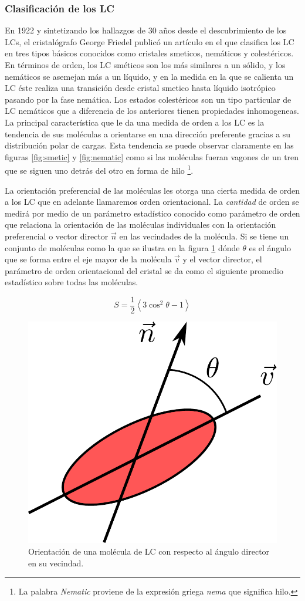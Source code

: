 \subsubsection{Clasificación de los LC}  
\label{sec:LC-clasification}
En 1922 y sintetizando los hallazgos de 30 años desde el descubrimiento
de los LCs, el cristalógrafo George Friedel publicó un artículo 
en el que clasifica los LC en tres tipos básicos conocidos como
cristales smeticos, nemáticos y colestéricos.
En términos de orden, los LC sméticos son los más similares a un
sólido, y los nemáticos se asemejan más a un líquido, y en la medida
en la que se calienta un LC éste realiza una transición desde cristal
smetico hasta líquido isotrópico pasando por la fase nemática. Los estados
colestéricos son un tipo particular de LC nemáticos que a diferencia
de los anteriores tienen propiedades inhomogeneas. 
La principal característica que le da una medida de orden a los LC es
la tendencia de sus moléculas a orientarse en una dirección
preferente gracias a su distribución polar de cargas. Esta tendencia
se puede observar claramente en las figuras \ref{fig:smetic} y
\ref{fig:nematic} como si las moléculas fueran vagones de un tren que
se siguen uno detrás del otro en forma de hilo \footnote{La palabra
\textit{Nematic} proviene de la expresión griega \textit{nema} que
significa hilo.}.  

La orientación preferencial de las moléculas les
otorga una cierta medida de orden a los LC que en adelante llamaremos orden
orientacional. La \textit{cantidad} de orden se medirá por medio de un
parámetro estadístico conocido como parámetro de orden que relaciona
la orientación de las moléculas individuales con la orientación
preferencial o vector director $\vec{n}$ en las vecindades de
la molécula. Si se tiene un conjunto de moléculas como la que se
ilustra en la figura \ref{fig:angulo_director} dónde 
$\theta$ es el ángulo que se forma entre el eje mayor de la molécula
$\vec{v}$ y el vector director, el parámetro de orden orientacional
del cristal se da como el siguiente promedio estadístico sobre todas
las moléculas.

$$ S = \frac{1}{2}\left<3\cos^2{\theta-1}\right>$$
 
\begin{figure}[h!]
\centering
\includegraphics[width=.3\linewidth]{angulo_director}
\caption{Orientación de una molécula de LC con respecto al ángulo
  director en su vecindad.}
\label{fig:angulo_director}
\end{figure}

